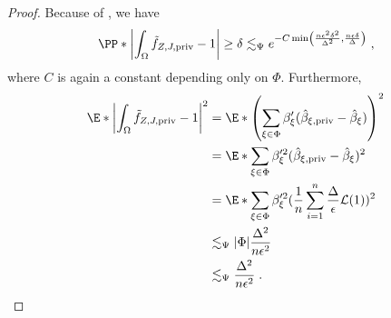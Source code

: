 \documentclass{article}
\newcommand{\1}{\mathds{1}}
\DeclarePairedDelimiter{\abs}{\lvert}{\rvert}
\DeclarePairedDelimiter{\paren}{\lparen}{\rparen}
\theoremstyle{plain}
\theoremstyle{definition}
\theoremstyle{remark}
\begin{document}
\begin{proof}
Because of , we have
\begin{equation}
        \begin{aligned}
            \PP*{\abs*{\int_{\Omega} \tilde{f}_{Z, J, \textrm{priv} } - 1} \geq \delta} \lesssim_{\Psi}  e^{- C \min \paren*{ \frac{n \epsilon^2 \delta^2}{\Delta^2}, \frac{n \epsilon \delta}{\Delta}} } \;,
        \end{aligned}
    \end{equation}
where $C$ is again a constant depending only on $\Phi$.
Furthermore, 
\begin{equation}
    \begin{aligned}
        \E*{\abs*{\int_{\Omega} \tilde{f}_{Z, J, \textrm{priv} } - 1}^2} 
        &=
        \E*{\paren*{\sum_{\xi \in \Phi} \beta_{\xi}' (\hat{\beta}_{\xi, \textrm{priv}} - \hat{\beta}_{\xi})}^2} \\
        &=
        \E*{\sum_{\xi \in \Phi} \beta_{\xi}'^2 (\hat{\beta}_{\xi, \textrm{priv}} - \hat{\beta}_{\xi})^2}  \\
        &=
        \E*{\sum_{\xi \in \Phi} \beta_{\xi}'^2 (\frac{1}{n} \sum_{i=1}^n \frac{\Delta}{\epsilon} \mathcal{L} (1))^2}  \\
        &\lesssim_{\Psi} | \Phi| \frac{\Delta^2}{n \epsilon^2} \\
        &\lesssim_{\Psi} \frac{\Delta^2}{n \epsilon^2} \;.
    \end{aligned}
\end{equation}
\end{proof}
\end{document}
